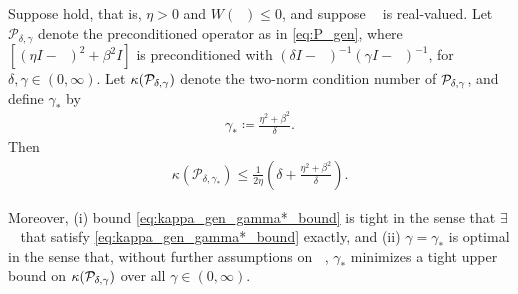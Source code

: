 \documentclass[review]{siamart}
\DeclareMathOperator{\cL}{\widehat{\mathcal{L}}}
\begin{document}
%
\begin{theorem}\label{th:cond}
Suppose  hold, that is, $\eta > 0$ and $W(\cL) \leq 0$,
and suppose $\cL$ is real-valued. Let $\mathcal{P}_{\delta,\gamma}$ denote
the preconditioned operator as in \eqref{eq:P_gen},
where $[(\eta I  - \cL)^2 + \beta^2 I]$ is preconditioned with
$(\delta I - \cL)^{-1} (\gamma I - \cL)^{-1}$, for $\delta, \gamma \in (0, \infty)$.
%
Let $\kappa({\cal P}_{\delta, \gamma})$ denote the two-norm condition number of ${\cal P}_{\delta,\gamma}$,
and define $\gamma_*$ by
\begin{align} \label{eq:gamma*_gen}
\gamma_* \coloneqq \frac{\eta^2+\beta^2}{\delta}.
\end{align}
Then
\begin{align} \label{eq:kappa_gen_gamma*_bound}
\kappa(\mathcal{P}_{\delta, \gamma_*}) \leq \frac{1}{2 \eta} \left( \delta + \frac{\eta^2 + \beta^2}{\delta} \right).
\end{align}

Moreover, (i) bound \eqref{eq:kappa_gen_gamma*_bound} is tight in the sense that $\exists$ $\cL$
that satisfy \eqref{eq:kappa_gen_gamma*_bound} exactly, and (ii) $\gamma = \gamma_*$ is optimal
in the sense that, without further assumptions on $\cL$, $\gamma_*$ minimizes a tight
upper bound on $\kappa({\cal P}_{\delta, \gamma})$ over all $\gamma \in (0, \infty)$.
\end{theorem}
%
\end{document}
